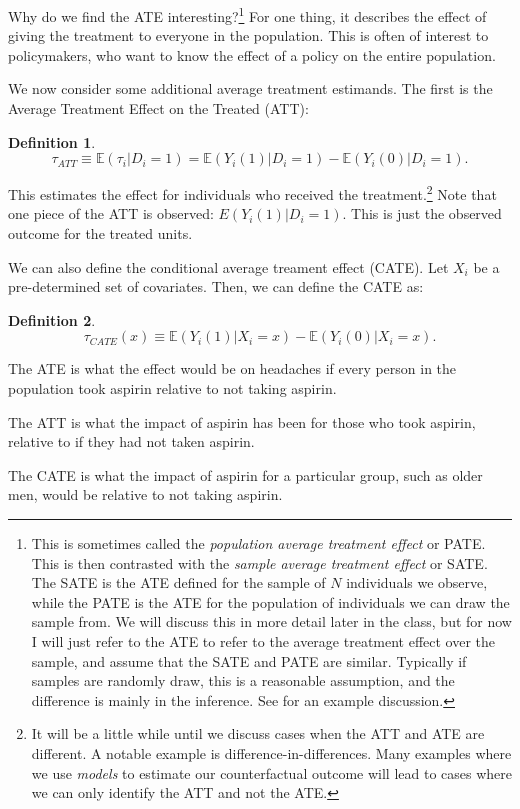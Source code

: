 \documentclass{tufte-handout}
\theoremstyle{break}
\newtheorem{defN}{Definition}
\newcommand{\continuation}{??}
\newenvironment{continueexample}[1]
 {\renewcommand{\continuation}{\ref{#1}}\excont[continued]}
 {\endexcont}
\newcommand{\E}{\mathbb{E}}
\begin{document}
Why do we find the ATE interesting?\footnote{This is sometimes called the \emph{population average treatment effect} or PATE. This is then contrasted with the \emph{sample average treatment effect} or SATE. The SATE is the ATE defined for the sample of $N$ individuals we observe, while the PATE is the ATE for the population of individuals we can draw the sample from. We will discuss this in more detail later in the class, but for now I will just refer to the ATE to refer to the average treatment effect over the  sample, and assume that the SATE and PATE are similar. Typically if samples are randomly draw, this is a reasonable assumption, and the difference is mainly in the inference. See \citet{imbens2004nonparametric} for an example discussion. } For one thing, it describes the effect of giving the treatment to everyone in the population. This is often of interest to policymakers, who want to know the effect of a policy on the entire population.

We now consider some additional average treatment estimands. The first is the Average Treatment Effect on the Treated (ATT):
\begin{defN}
  \begin{equation*}
    \tau_{ATT} \equiv \E(\tau_{i}| D_{i} = 1) = \E(Y_{i}(1) | D_{i} = 1) - \E(Y_{i}(0)| D_{i} = 1).
  \end{equation*}
\end{defN}
This estimates the effect for individuals who received the treatment.\footnote{It will be a little while until we discuss cases when the ATT and ATE are different. A notable example is difference-in-differences. Many examples where we use \emph{models} to estimate our counterfactual outcome will lead to cases where we can only identify the ATT and not the ATE.} Note that one piece of the ATT is observed: $E(Y_{i}(1) | D_{i} = 1)$. This is just the observed outcome for the treated units. 

We can also define the conditional average treament effect (CATE). Let $X_{i}$ be a pre-determined set of covariates. Then, we can define the CATE as:
\begin{defN}
  \begin{equation*}
    \tau_{CATE}(x) \equiv \E(Y_{i}(1) | X_{i} = x) - \E(Y_{i}(0)| X_{i} = x).
  \end{equation*}
\end{defN}


\begin{boxD}
  \begin{continueexample}{example1}
    The ATE is what the effect would be on headaches if every person in the population took aspirin relative to not taking aspirin.

    The ATT is what the impact of aspirin has been for those who took aspirin, relative to if they had not taken aspirin.

    The CATE is what the impact of aspirin for a particular group, such as older men, would be relative to not taking aspirin.
    \end{continueexample}
  \end{boxD}
\end{document}

